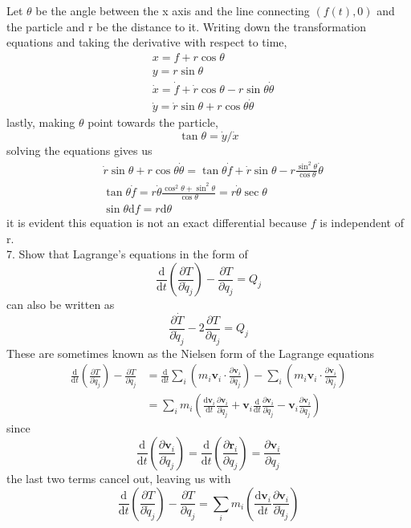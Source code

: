 \documentclass[]{article}
\numberwithin{equation}{section}
\begin{document}
Let $\theta$ be the angle between the x axis and the line connecting $(f(t),0)$ and the particle and r be the distance to it.  Writing down the transformation equations and taking the derivative with respect to time,
\begin{align*}
	&x=f+r\cos\theta\\
	&y=r\sin\theta\\
	&\dot x=\dot f+\dot r\cos\theta-r\sin\theta\dot\theta\\
	&\dot y=\dot r\sin\theta+r\cos\theta\dot\theta
\end{align*}
lastly, making $\theta$ point towards the particle,
$$\tan\theta=\dot y/\dot x$$
solving the equations gives us
\begin{align*}
	&\dot r\sin\theta+r\cos\theta\dot\theta=\tan\theta\dot f+\dot r\sin\theta-r\frac{\sin^2\theta}{\cos\theta}\dot\theta\\
	&\tan\theta\dot f=r\dot\theta\frac{\cos^2\theta+\sin^2\theta}{\cos\theta}=r\dot\theta\sec\theta\\
	&\sin\theta\mathrm df=r\mathrm d\theta
\end{align*}
it is evident this equation is not an exact differential because $f$ is independent of r.\\
7. Show that Lagrange's equations in the form of 
$$\frac{\mathrm d}{\mathrm dt}\left(\frac{\partial T}{\partial\dot q_j}\right)-\frac{\partial T}{\partial q_j}=Q_j$$
can also be written as 
$$\frac{\partial\dot T}{\partial\dot q_j}-2\frac{\partial T}{\partial q_j}=Q_j$$
These are sometimes known as the Nielsen form of the Lagrange equations
\begin{align*}
	\frac{\mathrm d}{\mathrm dt}\left(\frac{\partial T}{\partial\dot q_j}\right)-\frac{\partial T}{\partial q_j}&=\frac{\mathrm d}{\mathrm dt}\sum_i\left(m_i\mathbf v_i\cdot\frac{\partial\mathbf v_i}{\partial\dot q_j}\right)-\sum_i\left(m_i\mathbf v_i\cdot\frac{\partial\mathbf v_i}{\partial q_j}\right)\\
	&=\sum_im_i\left( \frac{\mathrm d\mathbf v_i}{\mathrm dt}\frac{\partial\mathbf v_i}{\partial\dot q_j}+\mathbf v_i\frac{\mathrm d}{\mathrm dt}\frac{\partial\mathbf v_i}{\partial\dot q_j}-\mathbf v_i\frac{\partial\mathbf v_i}{\partial q_j} \right)
\end{align*}
since
$$\frac{\mathrm d}{\mathrm dt}\left(\frac{\partial\mathbf v_i}{\partial \dot q_j}\right)=\frac{\mathrm d}{\mathrm dt}\left(\frac{\partial\mathbf r_i}{\partial q_j}\right)=\frac{\partial\mathbf v_i}{\partial q_j}$$
the last two terms cancel out, leaving us with
$$\frac{\mathrm d}{\mathrm dt}\left(\frac{\partial T}{\partial\dot q_j}\right)-\frac{\partial T}{\partial q_j}=\sum_im_i\left(\frac{\mathrm d\mathbf v_i}{\mathrm dt}\frac{\partial\mathbf v_i}{\partial\dot q_j}\right)$$
\end{document}

